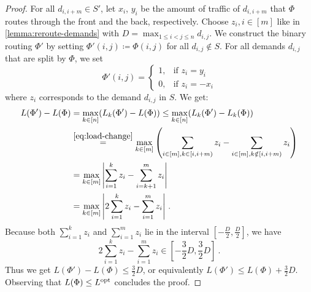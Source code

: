 \begin{proof}
	For all $d_{i, i+m} \in S'$, let $x_i$, $y_i$ be the amount of traffic of $d_{i, i+m}$ that $\Phi$ routes through the front and the back, respectively.
	Choose $z_i, i \in [m]$ like in \cref{lemma:reroute-demands} with $D = \max_{1 \leq i < j \leq n} d_{i, j}$.
	We construct the binary routing $\Phi'$ by setting $\Phi'(i, j) \coloneqq \Phi(i, j)$ for all $d_{i,j} \notin S$.
	For all demands $d_{i, j}$ that are split by $\Phi$, we set
	\begin{equation}
		\Phi'(i, j) = \begin{cases}
			1, & \text{if } z_i = y_i \\
			0, & \text{if } z_i = -x_i
		\end{cases}
	\end{equation}
	where $z_i$ corresponds to the demand $d_{i, j}$ in $S$.
	We get:
	\begin{align}
		L(\Phi') - L(\Phi) &= \max_{k \in [n]} (L_k(\Phi') - L(\Phi)) 
		\leq \max_{k \in [n]} (L_k(\Phi') - L_k(\Phi))\\
		& \stackrel{\ref{eq:load-change}}{=} \max_{k \in [m]} \left(\sum_{i \in [m], k \in [i, i+m)} z_i - \sum_{i \in [m], k \notin [i, i+m)} z_i\right)\\
		&= \max_{k \in [m]} \abs{\sum_{i = 1}^k z_i - \sum_{i = k+1}^m z_i }\\
		&= \max_{k \in [m]} \abs{2\sum_{i = 1}^k z_i - \sum_{i = 1}^m z_i } \ . \label{eq:partial-reroutes}
	\end{align}
	Because both $\sum_{i = 1}^k z_i$ and $\sum_{i = 1}^m z_i$ lie in the interval $[-\frac{D}{2}, \frac{D}{2}]$, 
	we have 
	\begin{equation}
		2\sum_{i = 1}^k z_i - \sum_{i = 1}^m z_i \in [-\frac{3}{2}D, \frac{3}{2}D] \ .
	\end{equation}
	Thus we get $L(\Phi') - L(\Phi) \leq \frac{3}{2}D$, or equivalently $L(\Phi') \leq L(\Phi) + \frac{3}{2}D$.
	Observing that $L(\Phi) \leq L^{\mathrm{opt}}$ concludes the proof.
\end{proof}